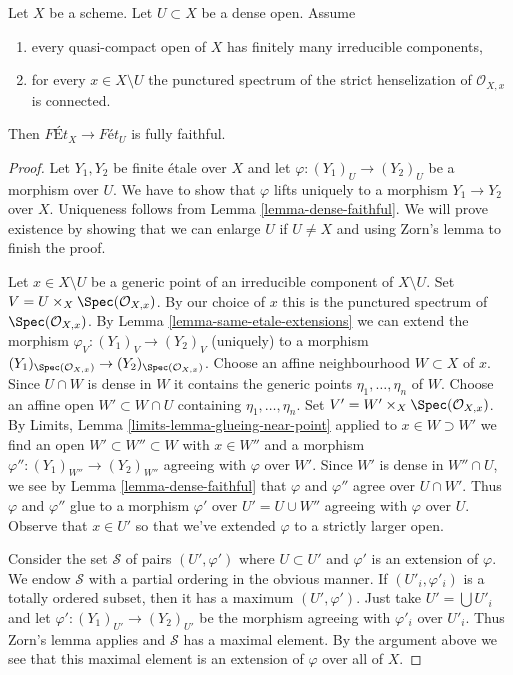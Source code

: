 \begin{lemma}
\label{lemma-quasi-compact-dense-open-connected-at-infinity}
Let $X$ be a scheme. Let $U \subset X$ be a dense open. Assume
\begin{enumerate}
\item every quasi-compact open of $X$ has finitely many
irreducible components,
\item for every $x \in X \setminus U$ the punctured spectrum of the
strict henselization of $\mathcal{O}_{X, x}$ is connected.
\end{enumerate}
Then $\textit{F\'Et}_X \to \textit{F\'et}_U$ is fully faithful.
\end{lemma}

\begin{proof}
Let $Y_1, Y_2$ be finite \'etale over $X$ and let
$\varphi : (Y_1)_U \to (Y_2)_U$ be a morphism over $U$. We have to show that
$\varphi$ lifts uniquely to a morphism $Y_1 \to Y_2$ over $X$.
Uniqueness follows from Lemma \ref{lemma-dense-faithful}.
We will prove existence by showing that we can enlarge $U$
if $U \not = X$ and using Zorn's lemma to finish the proof.

\medskip\noindent
Let $x \in X \setminus U$ be a generic point of an irreducible component
of $X \setminus U$. Set $V = U \times_X \Spec(\mathcal{O}_{X, x})$.
By our choice of $x$ this is the punctured spectrum of
$\Spec(\mathcal{O}_{X, x})$. By
Lemma \ref{lemma-same-etale-extensions}
we can extend the morphism $\varphi_V : (Y_1)_V \to (Y_2)_V$
(uniquely) to a morphism
$(Y_1)_{\Spec(\mathcal{O}_{X, x})} \to (Y_2)_{\Spec(\mathcal{O}_{X, x})}$.
Choose an affine neighbourhood $W \subset X$ of $x$.
Since $U \cap W$ is dense in $W$ it contains the generic points
$\eta_1, \ldots, \eta_n$ of $W$. Choose an affine open
$W' \subset W \cap U$ containing $\eta_1, \ldots, \eta_n$.
Set $V' = W' \times_X \Spec(\mathcal{O}_{X, x})$.
By Limits, Lemma \ref{limits-lemma-glueing-near-point}
applied to $x \in W \supset W'$
we find an open $W' \subset W'' \subset W$ with $x \in W''$
and a morphism $\varphi'' : (Y_1)_{W''} \to (Y_2)_{W''}$
agreeing with $\varphi$ over $W'$. Since $W'$ is dense in
$W'' \cap U$, we see by Lemma \ref{lemma-dense-faithful}
that $\varphi$ and $\varphi''$ agree over $U \cap W'$.
Thus $\varphi$ and $\varphi''$ glue to a morphism
$\varphi'$ over $U' = U \cup W''$ agreeing with $\varphi$ over $U$.
Observe that $x \in U'$ so that we've extended $\varphi$
to a strictly larger open.

\medskip\noindent
Consider the set $\mathcal{S}$ of pairs $(U', \varphi')$ where $U \subset U'$
and $\varphi'$ is an extension of $\varphi$. We endow $\mathcal{S}$
with a partial ordering in the obvious manner. If $(U'_i, \varphi'_i)$
is a totally ordered subset, then it has a maximum $(U', \varphi')$.
Just take $U' = \bigcup U'_i$ and let
$\varphi' : (Y_1)_{U'} \to (Y_2)_{U'}$ be the morphism
agreeing with $\varphi'_i$ over $U'_i$. Thus Zorn's lemma applies
and $\mathcal{S}$ has a maximal element. By the argument above
we see that this maximal element is an extension of $\varphi$
over all of $X$.
\end{proof}

